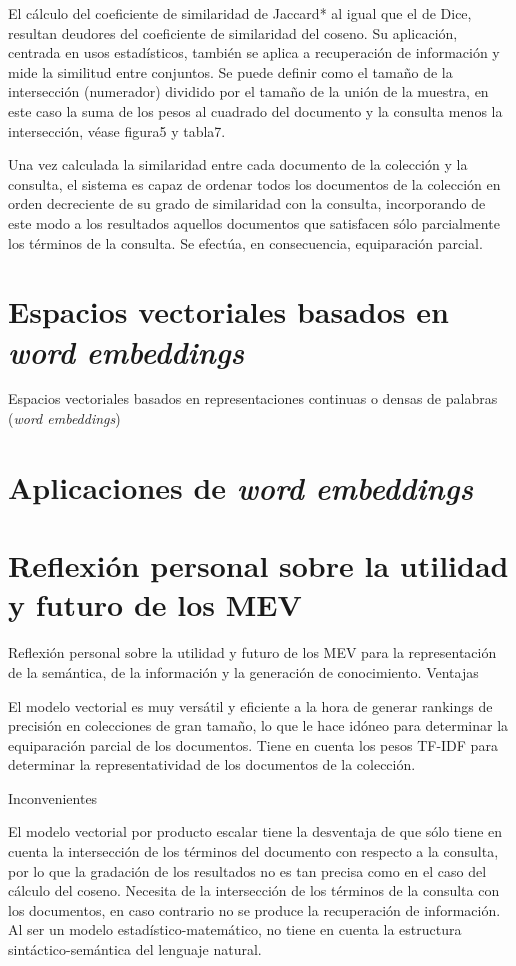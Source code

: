 \documentclass{article}
\begin{document}
El cálculo del coeficiente de similaridad de Jaccard* al igual que el de Dice, resultan deudores del coeficiente de similaridad del coseno. Su aplicación, centrada en usos estadísticos, también se aplica a recuperación de información y mide la similitud entre conjuntos. Se puede definir como el tamaño de la intersección (numerador) dividido por el tamaño de la unión de la muestra, en este caso la suma de los pesos al cuadrado del documento y la consulta menos la intersección, véase figura5 y tabla7.

Una vez calculada la similaridad entre cada documento de la colección y la consulta, el sistema es capaz de ordenar todos los documentos de la colección en orden decreciente de su grado de similaridad con la consulta, incorporando de este modo a los resultados aquellos documentos que satisfacen sólo parcialmente los términos de la consulta. Se efectúa, en consecuencia, equiparación parcial.

\section{Espacios vectoriales basados en \textit{word embeddings}}

Espacios vectoriales basados en representaciones continuas o densas de	palabras (\textit{word embeddings})

\section{Aplicaciones de \textit{word embeddings}}

\section{Reflexión personal sobre la utilidad y futuro de los MEV}

Reflexión personal sobre la utilidad y futuro de los MEV para la representación de la semántica, de la información y la generación de conocimiento.
 Ventajas

El modelo vectorial es muy versátil y eficiente a la hora de generar rankings de precisión en colecciones de gran tamaño, lo que le hace idóneo para determinar la equiparación parcial de los documentos. 
Tiene en cuenta los pesos TF-IDF para determinar la representatividad de los documentos de la colección.

Inconvenientes

El modelo vectorial por producto escalar tiene la desventaja de que sólo tiene en cuenta la intersección de los términos del documento con respecto a la consulta, por lo que la gradación de los resultados no es tan precisa como en el caso del cálculo del coseno.
Necesita de la intersección de los términos de la consulta con los documentos, en caso contrario no se produce la recuperación de información.
Al ser un modelo estadístico-matemático, no tiene en cuenta la estructura sintáctico-semántica del lenguaje natural.
\end{document}

